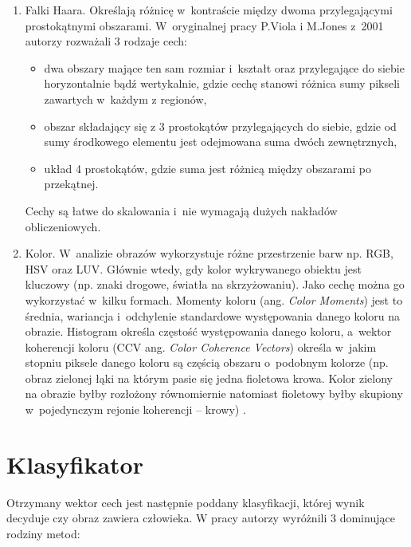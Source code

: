 \begin{enumerate}
\item Falki Haara.
Określają różnicę w~kontraście między dwoma przylegającymi prostokątnymi obszarami. 
W~oryginalnej pracy P.Viola i M.Jones z~2001 \cite{viola2001rapid} autorzy rozważali 3 rodzaje cech: 
\begin{itemize}
	\item dwa obszary mające ten sam rozmiar i~kształt oraz przylegające do siebie horyzontalnie bądź wertykalnie, gdzie cechę stanowi różnica sumy pikseli zawartych w~każdym z regionów, 
	\item obszar składający się z 3 prostokątów przylegających do siebie, gdzie od sumy środkowego elementu jest odejmowana suma dwóch zewnętrznych,
	\item układ 4 prostokątów, gdzie suma jest różnicą między obszarami po przekątnej. %
\end{itemize}
Cechy są łatwe do skalowania i~nie wymagają dużych nakładów obliczeniowych.

\item Kolor. 
W~analizie obrazów wykorzystuje różne przestrzenie barw np. RGB, HSV oraz LUV. 
Głównie wtedy, gdy kolor wykrywanego obiektu jest kluczowy (np. znaki drogowe, światła na skrzyżowaniu). 
Jako cechę można go wykorzystać w~kilku formach. 
Momenty koloru (ang. \textit{Color Moments}) jest to średnia, wariancja i~odchylenie standardowe występowania danego koloru na obrazie. 
Histogram określa częstość występowania danego koloru, a~wektor koherencji koloru (CCV ang. \textit{Color Coherence Vectors}) określa w~jakim stopniu piksele danego koloru są częścią obszaru o~podobnym kolorze (np. obraz zielonej łąki na którym pasie się jedna fioletowa krowa. Kolor zielony na obrazie byłby rozłożony równomiernie natomiast fioletowy byłby skupiony w~pojedynczym rejonie koherencji -- krowy) \cite{kodituwakku2004comparison}.

\end{enumerate}

\section{Klasyfikator}

Otrzymany wektor cech jest następnie poddany klasyfikacji, której wynik decyduje czy obraz zawiera człowieka.
W pracy \cite{benenson2014ten} autorzy wyróżnili 3 dominujące rodziny metod:

